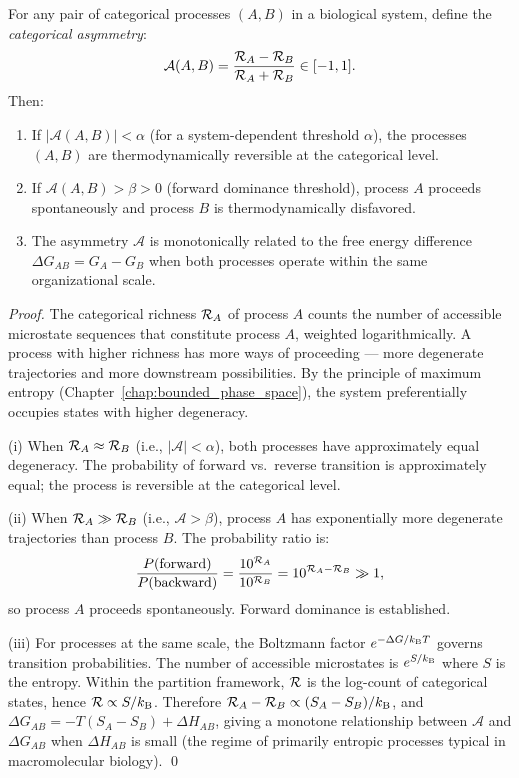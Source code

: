\begin{theorem}
\label{thm:categorical_asymmetry}
For any pair of categorical processes $(A, B)$ in a biological system, define
the \emph{categorical asymmetry}:
\begin{equation}
  \mathcal{A}(A, B) = \frac{\mathcal{R}_A - \mathcal{R}_B}{\mathcal{R}_A + \mathcal{R}_B} \in [-1, 1].
  \label{eq:asymmetry}
\end{equation}
Then:
\begin{enumerate}[label=(\roman*)]
  \item If $|\mathcal{A}(A,B)| < \alpha$ (for a system-dependent threshold
        $\alpha$), the processes $(A, B)$ are thermodynamically reversible
        at the categorical level.
  \item If $\mathcal{A}(A,B) > \beta > 0$ (forward dominance threshold),
        process $A$ proceeds spontaneously and process $B$ is thermodynamically
        disfavored.
  \item The asymmetry $\mathcal{A}$ is monotonically related to the free energy
        difference $\Delta G_{AB} = G_A - G_B$ when both processes operate
        within the same organizational scale.
\end{enumerate}
\end{theorem}

\begin{proof}
The categorical richness $\mathcal{R}_A$ of process $A$ counts the number of
accessible microstate sequences that constitute process $A$, weighted
logarithmically. A process with higher richness has more ways of proceeding
--- more degenerate trajectories and more downstream possibilities. By the
principle of maximum entropy (Chapter~\ref{chap:bounded_phase_space}), the
system preferentially occupies states with higher degeneracy.

(i) When $\mathcal{R}_A \approx \mathcal{R}_B$ (i.e., $|\mathcal{A}| < \alpha$), both
processes have approximately equal degeneracy. The probability of forward
vs.\ reverse transition is approximately equal; the process is reversible
at the categorical level.

(ii) When $\mathcal{R}_A \gg \mathcal{R}_B$ (i.e., $\mathcal{A} > \beta$), process $A$
has exponentially more degenerate trajectories than process $B$. The
probability ratio is:
\begin{equation}
  \frac{P(\text{forward})}{P(\text{backward})} = \frac{10^{\mathcal{R}_A}}{10^{\mathcal{R}_B}} = 10^{\mathcal{R}_A - \mathcal{R}_B} \gg 1,
  \label{eq:forward_dominance}
\end{equation}
so process $A$ proceeds spontaneously. Forward dominance is established.

(iii) For processes at the same scale, the Boltzmann factor $e^{-\Delta G / k_{\mathrm{B}} T}$
governs transition probabilities. The number of accessible microstates is
$e^{S/k_{\mathrm{B}}}$ where $S$ is the entropy. Within the partition framework,
$\mathcal{R}$ is the log-count of categorical states, hence $\mathcal{R} \propto S / k_{\mathrm{B}}$.
Therefore $\mathcal{R}_A - \mathcal{R}_B \propto (S_A - S_B)/k_{\mathrm{B}}$, and
$\Delta G_{AB} = -T(S_A - S_B) + \Delta H_{AB}$, giving a monotone relationship
between $\mathcal{A}$ and $\Delta G_{AB}$ when $\Delta H_{AB}$ is small
(the regime of primarily entropic processes typical in macromolecular biology).
\qed
\end{proof}

